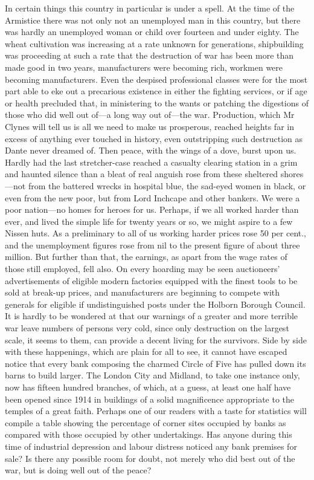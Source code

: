 \documentclass{book}
\begin{document}
In certain things this country in particular is under a spell. At the time of the Armistice there was not only not an unemployed man in this country, but there was hardly an unemployed woman or child over fourteen and under eighty. The wheat cultivation was increasing at a rate unknown for generations, shipbuilding was proceeding at such a rate that the destruction of war has been more than made good in two years, manufacturers were becoming rich, workmen were becoming manufacturers. Even the despised professional classes were for the most part able to eke out a precarious existence in either the fighting services, or if age or health precluded that, in ministering to the wants or patching the digestions of those who did well out of—a long way out of—the war. Production, which Mr Clynes will tell us is all we need to make us prosperous, reached heights far in excess of anything ever touched in history, even outstripping such destruction as Dante never dreamed of. Then peace, with the wings of a dove, burst upon us. Hardly had the last stretcher-case reached a casualty clearing station in a grim and haunted silence than a bleat of real anguish rose from these sheltered shores—not from the battered wrecks in hospital blue, the sad-eyed women in black, or even from the new poor, but from Lord Inchcape and other bankers. We were a poor nation—no homes for heroes for us. Perhaps, if we all worked harder than ever, and lived the simple life for twenty years or so, we might aspire to a few Nissen huts. As a preliminary to all of us working harder prices rose 50 per cent., and the unemployment figures rose from nil to the present figure of about three million. But further than that, the earnings, as apart from the wage rates of those still employed, fell also. On every hoarding may be seen auctioneers’ advertisements of eligible modern factories equipped with the finest tools to be sold at break-up prices, and manufacturers are beginning to compete with generals for eligible if undistinguished posts under the Holborn Borough Council. It is hardly to be wondered at that our warnings of a greater and more terrible war leave numbers of persons very cold, since only destruction on the largest scale, it seems to them, can provide a decent living for the survivors. Side by side with these happenings, which are plain for all to see, it cannot have escaped notice that every bank composing the charmed Circle of Five has pulled down its barns to build larger. The London City and Midland, to take one instance only, now has fifteen hundred branches, of which, at a guess, at least one half have been opened since 1914 in buildings of a solid magnificence appropriate to the temples of a great faith. Perhaps one of our readers with a taste for statistics will compile a table showing the percentage of corner sites occupied by banks as compared with those occupied by other undertakings. Has anyone during this time of industrial depression and labour distress noticed any bank premises for sale? Is there any possible room for doubt, not merely who did best out of the war, but is doing well out of the peace?
\end{document}
